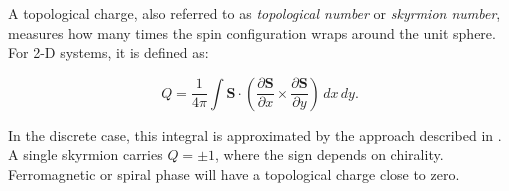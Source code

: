 A topological charge, also referred to as \emph{topological number} or \emph{skyrmion number}, measures how many times the spin configuration wraps around the unit sphere. For 2-D systems, it is defined as:

\begin{equation}
    Q = \frac{1}{4\pi} \int \bm{S} \cdot \left( \frac{\partial \bm{S}}{\partial x} \times \frac{\partial \bm{S}}{\partial y} \right) \, dx\,dy.
\end{equation}

In the discrete case, this integral is approximated by the approach described in \cite{berg1981definition, yin2016topological}. A single skyrmion carries $Q = \pm 1$, where the sign depends on chirality. Ferromagnetic or spiral phase will have a topological charge close to zero.

